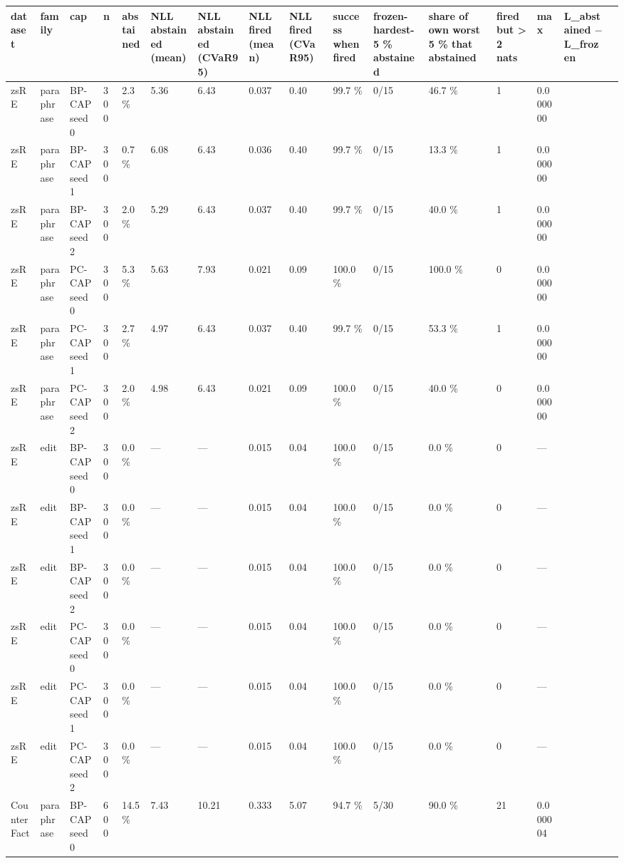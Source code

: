 \documentclass[10pt,a4paper]{article}
\begin{document}
\begin{center}\tiny
\begin{tabularx}{\textwidth}{@{}p{}XXXXXXXXXXXXXXX@{}}
\toprule
dataset & family & cap & n & abstained & NLL abstained (mean) & NLL abstained (CVaR95) & NLL fired (mean) & NLL fired (CVaR95) & success when fired & frozen-hardest-5 \% abstained & share of own worst 5 \% that abstained & fired but > 2 nats & max & L\_abstained $-$ L\_frozen &  \\ \midrule
zsRE & paraphrase & BP-CAP seed 0 & 300 & 2.3 \% & 5.36 & 6.43 & 0.037 & 0.40 & 99.7 \% & 0/15 & 46.7 \% & 1 & 0.000000 &  &  \\
zsRE & paraphrase & BP-CAP seed 1 & 300 & 0.7 \% & 6.08 & 6.43 & 0.036 & 0.40 & 99.7 \% & 0/15 & 13.3 \% & 1 & 0.000000 &  &  \\
zsRE & paraphrase & BP-CAP seed 2 & 300 & 2.0 \% & 5.29 & 6.43 & 0.037 & 0.40 & 99.7 \% & 0/15 & 40.0 \% & 1 & 0.000000 &  &  \\
zsRE & paraphrase & PC-CAP seed 0 & 300 & 5.3 \% & 5.63 & 7.93 & 0.021 & 0.09 & 100.0 \% & 0/15 & 100.0 \% & 0 & 0.000000 &  &  \\
zsRE & paraphrase & PC-CAP seed 1 & 300 & 2.7 \% & 4.97 & 6.43 & 0.037 & 0.40 & 99.7 \% & 0/15 & 53.3 \% & 1 & 0.000000 &  &  \\
zsRE & paraphrase & PC-CAP seed 2 & 300 & 2.0 \% & 4.98 & 6.43 & 0.021 & 0.09 & 100.0 \% & 0/15 & 40.0 \% & 0 & 0.000000 &  &  \\
zsRE & edit & BP-CAP seed 0 & 300 & 0.0 \% & — & — & 0.015 & 0.04 & 100.0 \% & 0/15 & 0.0 \% & 0 & — &  &  \\
zsRE & edit & BP-CAP seed 1 & 300 & 0.0 \% & — & — & 0.015 & 0.04 & 100.0 \% & 0/15 & 0.0 \% & 0 & — &  &  \\
zsRE & edit & BP-CAP seed 2 & 300 & 0.0 \% & — & — & 0.015 & 0.04 & 100.0 \% & 0/15 & 0.0 \% & 0 & — &  &  \\
zsRE & edit & PC-CAP seed 0 & 300 & 0.0 \% & — & — & 0.015 & 0.04 & 100.0 \% & 0/15 & 0.0 \% & 0 & — &  &  \\
zsRE & edit & PC-CAP seed 1 & 300 & 0.0 \% & — & — & 0.015 & 0.04 & 100.0 \% & 0/15 & 0.0 \% & 0 & — &  &  \\
zsRE & edit & PC-CAP seed 2 & 300 & 0.0 \% & — & — & 0.015 & 0.04 & 100.0 \% & 0/15 & 0.0 \% & 0 & — &  &  \\
CounterFact & paraphrase & BP-CAP seed 0 & 600 & 14.5 \% & 7.43 & 10.21 & 0.333 & 5.07 & 94.7 \% & 5/30 & 90.0 \% & 21 & 0.000004 &  &  \\

\end{tabularx}
\end{center}
\end{document}
